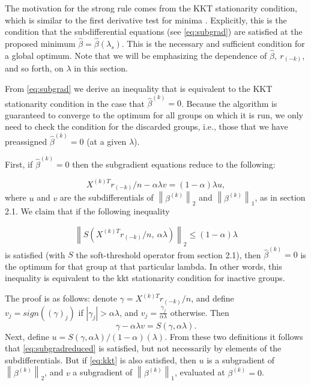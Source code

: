\documentclass[12pt]{article}
\newcommand{\norm}[1]{\left\lVert #1 \right\rVert}
\begin{document}
The motivation for the strong rule comes from the KKT stationarity condition, which is similar to the first derivative test for minima \citep{boyd2004convex}. Explicitly, this is the condition that the subdifferential equations (see \autoref{eq:subgrad}) are satisfied at the proposed minimum $\hat{\beta} =\hat{\beta}(\lambda_s)$. This is the necessary and sufficient condition for a global optimum. Note that we will be emphasizing the dependence of $\hat{\beta},\ r_{(-k)}$, and so forth, on $\lambda$ in this section.
 
From \autoref{eq:subgrad} we derive an inequality that is equivalent to the KKT stationarity condition in the case that $\hat{\beta}^{(k)}=0$. Because the algorithm is guaranteed to converge to the optimum for all groups on which it is run, we only need to check the condition for the discarded groups, i.e., those that we have preassigned $\hat{\beta}^{(k)} = 0$ (at a given $\lambda$). 

First, if $\hat{\beta}^{(k)}=0$ then the subgradient equations reduce to the following:

\begin{equation}
\label{eq:subgradreduced}
X^{(k)T}r_{(-k)}/n - \alpha \lambda v = (1-\alpha) \lambda u,
\end{equation}
where $u$ and $v$ are the subdifferentials of $\norm{\beta^{(k)}}_2$ and $\norm{\beta^{(k)}}_1$, as in section 2.1. We claim that if the following inequality

\begin{equation}
\label{eq:kkt}
\norm{S(X^{(k)T}r_{(-k)}/n,\ \alpha\lambda)}_2 \leq (1-\alpha)\lambda
\end{equation}
is satisfied (with $S$ the soft-threshold operator from section 2.1), then $\hat{\beta}^{(k)}=0$ is the optimum for that group at that particular lambda. In other words, this inequality is equivalent to the kkt stationarity condition for inactive groups.

The proof is as follows: denote $\gamma = X^{(k)T}r_{(-k)}/n$, and define $v_j = sign((\gamma)_j)$ if $|\gamma_j| > \alpha \lambda$, and $v_j = \frac{\gamma_j}{\alpha \lambda}$ otherwise. Then 
\[
\gamma - \alpha \lambda v = S(\gamma,\alpha \lambda).
\]
Next, define $u = S(\gamma,\alpha \lambda)/(1-\alpha)(\lambda)$. From these two definitions it follows that \autoref{eq:subgradreduced} is satisfied, but not necessarily by elements of the subdifferentials. But if \autoref{eq:kkt} is also satisfied, then $u$ is a subgradient of $\norm{\beta^{(k)}}_2$, and $v$ a subgradient of $\norm{\beta^{(k)}}_1$, evaluated at $\beta^{(k)}=0$.
\end{document}
